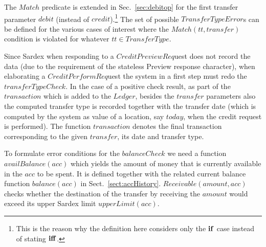 The $Match$ predicate is extended in Sec.~\ref{sec:debitop} for the first transfer parameter $debit$ (instead of $credit$).\footnote{This is the reason why the definition here considers only the $\mathrel{\mathbf{if}}$ case instead of stating $\mathrel{\mathbf{iff}}$.} The set of possible $TransferTypeError$s can be defined for the various cases of interest where
the $Match(tt,transfer)$ condition is violated for whatever $tt \in TransferType$.


Since Sardex when responding to a $CreditPreviewReq$uest does not record the data (due to the requirement of the stateless Preview response character), when elaborating a $CreditPerformReq$uest the system in a first step must redo the $transferTypeCheck$. In the case of a positive check result, as part of the $transaction$ which is added to the $Ledger$, besides the $transfer$ parameters also the computed transfer type is recorded together with the transfer date (which is computed by the system as value of a location, say $today$, when the credit request is performed). The function $transaction$ denotes the final transaction corresponding to the given $transfer$, its date and transfer type. 

To formulate error conditions for the $balanceCheck$ we need a function $availBalance(acc)$ which yields the amount of money that is currently available in the $acc$ to be spent. It is defined together with the related current balance function $balance(acc)$ in Sect.~\ref{sect:accHistory}. $Receivable(amount,acc)$ checks whether the destination of the transfer by receiving the $amount$ would exceed its upper Sardex limit $upperLimit(acc)$.


